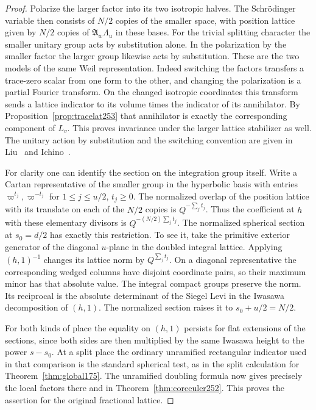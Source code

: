 \documentclass[a4paper,11pt]{article}
\theoremstyle{definition}
\theoremstyle{remark}
\numberwithin{equation}{section}
\begin{document}
\begin{proof}
Polarize the larger factor into its two isotropic halves. The
Schr\"odinger variable then consists of \(N/2\) copies of the
smaller space, with position lattice given by \(N/2\) copies
of \(\mathfrak A_w\Lambda_u\) in these bases. For the trivial
splitting character the smaller unitary group acts by substitution
alone. In the polarization by the smaller factor the larger group
likewise acts by substitution. These are the two models of the
same Weil representation. Indeed switching the factors transfers
a trace-zero scalar from one form to the other, and changing the
polarization is a partial Fourier transform. On the changed
isotropic coordinates this transform sends a lattice indicator
to its volume times the indicator of its annihilator. By
Proposition~\ref{prop:tracelat253} that annihilator is exactly
the corresponding component of \(L_v\). This proves invariance
under the larger lattice stabilizer as well. The unitary action
by substitution and the switching convention are given in
Liu~\cite[Section~3]{XXIII-XVIII-liu328}
and Ichino~\cite[Section~2.2]{XXIII-XVIII-ichino328}.

For clarity one can identify the section on the integration
group itself. Write a Cartan representative of the smaller group
in the hyperbolic basis with entries \(\varpi^{t_j},\varpi^{-t_j}\)
for \(1\le j\le u/2\), \(t_j\ge0\). The normalized overlap of
the position lattice with its translate on each of the \(N/2\)
copies is \(Q^{-\sum_j t_j}\). Thus the coefficient at \(h\)
with these elementary divisors is \(Q^{-(N/2)\sum_jt_j}\).
The normalized spherical section at \(s_0=d/2\) has exactly this
restriction. To see it, take the primitive exterior generator of
the diagonal \(u\)-plane in the doubled integral lattice.
Applying \((h,1)^{-1}\) changes its lattice norm by
\(Q^{\sum_jt_j}\). On a diagonal representative the corresponding
wedged columns have disjoint coordinate pairs, so their maximum
minor has that absolute value. The integral compact groups
preserve the norm. Its reciprocal is the absolute determinant
of the Siegel Levi in the Iwasawa decomposition of \((h,1)\).
The normalized section raises it to \(s_0+u/2=N/2\).

For both kinds of place the equality on \((h,1)\) persists
for flat extensions of the sections, since both sides are then
multiplied by the same Iwasawa height to the power \(s-s_0\).
At a split place the ordinary unramified rectangular indicator
used in that comparison is the standard spherical test, as in
the split calculation for Theorem~\ref{thm:global175}. The
unramified doubling formula now gives precisely the local factors
there and in Theorem~\ref{thm:coreeuler252}. This proves the
assertion for the original fractional lattice.
\end{proof}
\end{document}
